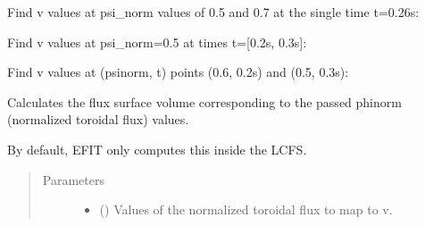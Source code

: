\documentclass[letterpaper,10pt,english]{sphinxmanual}
\begin{document}
\begin{fulllineitems}
\begin{fulllineitems}
Find v values at psi\_norm values of 0.5 and 0.7 at the single time
t=0.26s:

\begin{sphinxVerbatim}[commandchars=\\\{\}]
  \PYG{p}{[} \PYG{p}{]} 
\end{sphinxVerbatim}

Find v values at psi\_norm=0.5 at times t={[}0.2s, 0.3s{]}:

\begin{sphinxVerbatim}[commandchars=\\\{\}]
   \PYG{p}{[} \PYG{p}{]}
\end{sphinxVerbatim}

Find v values at (psinorm, t) points (0.6, 0.2s) and (0.5, 0.3s):

\begin{sphinxVerbatim}[commandchars=\\\{\}]
  \PYG{p}{[} \PYG{p}{]} \PYG{p}{[} \PYG{p}{]} 
\end{sphinxVerbatim}

\end{fulllineitems}


\begin{fulllineitems}
\label{\detokenize{eqtools:eqtools.core.Equilibrium.phinorm2v}}
Calculates the flux surface volume corresponding to the passed phinorm (normalized toroidal flux) values.

By default, EFIT only computes this inside the LCFS.
\begin{quote}\begin{description}
\item[{Parameters}] \leavevmode\begin{itemize}
\item {} 
 () \textendash{} Values of the normalized
toroidal flux to map to v.


\end{itemize}
\end{description}
\end{quote}
\end{fulllineitems}
\end{fulllineitems}
\end{document}
